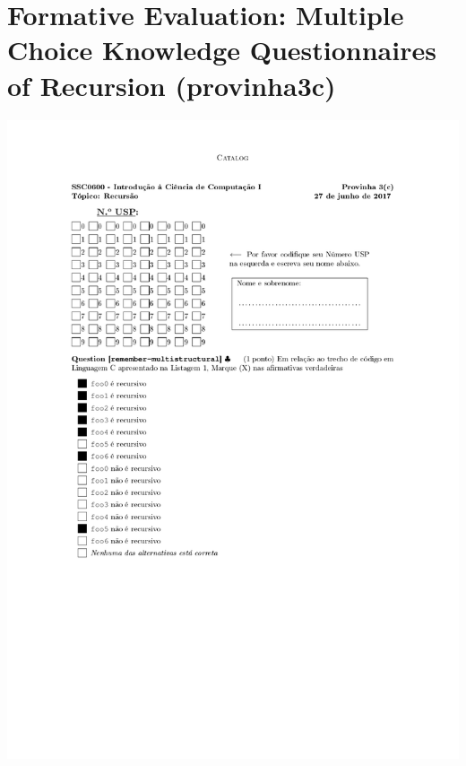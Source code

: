 \section{Formative Evaluation: Multiple Choice Knowledge Questionnaires of Recursion (provinha3c)}
\label{annex:third-study-pos}
\includegraphics[page=1,width=1\textwidth]{images/annex/third-study-pos.pdf}
\newpage
